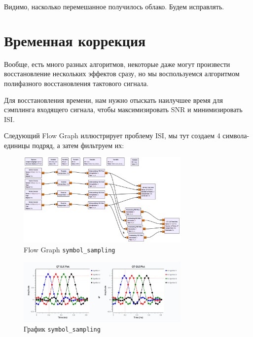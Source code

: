 \documentclass[a4paper,12pt]{report}
\begin{document}
    Видимо, насколько перемешанное получилось облако. Будем исправлять.
    
    \chapter{Временная коррекция}
    
    Вообще, есть много разных алгоритмов, некоторые даже могут произвести восстановление нескольких эффектов сразу, но мы воспользуемся алгоритмом полифазного восстановления тактового сигнала.
    
    Для восстановления времени, нам нужно отыскать наилучшее время для сэмплинга входящего сигнала, чтобы максимизировать SNR и минимизировать ISI.
    
    Следующий Flow Graph иллюстрирует проблему ISI, мы тут создаем 4 символа-единицы подряд, а затем фильтруем их:
    
    \begin{figure}[H]
        \centering
        \includegraphics[width=0.75\textwidth]{images/symbol_sampling_fg.png}
        \caption{Flow Graph \texttt{symbol\_sampling}}
        \label{fig:symbol_sampling_fg}
    \end{figure}
    
    \begin{figure}[H]
        \centering
        \includegraphics[width=0.75\textwidth]{images/symbol_sampling_plot.png}
        \caption{График \texttt{symbol\_sampling}}
        \label{fig:symbol_sampling_plot}
    \end{figure}
    
\end{document}
